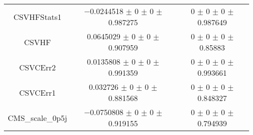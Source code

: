 \begin{table}
\begin{tabular}{ccc}
CSVHFStats1 & \num{-0.0244518} $\pm$ \num{0} $\pm$ \num{0} $\pm$ \num{0.987275} & \num{0} $\pm$ \num{0} $\pm$ \num{0} $\pm$ \num{0.987649}\\
CSVHF & \num{0.0645029} $\pm$ \num{0} $\pm$ \num{0} $\pm$ \num{0.907959} & \num{0} $\pm$ \num{0} $\pm$ \num{0} $\pm$ \num{0.85883}\\
CSVCErr2 & \num{0.0135808} $\pm$ \num{0} $\pm$ \num{0} $\pm$ \num{0.991359} & \num{0} $\pm$ \num{0} $\pm$ \num{0} $\pm$ \num{0.993661}\\
CSVCErr1 & \num{0.032726} $\pm$ \num{0} $\pm$ \num{0} $\pm$ \num{0.881568} & \num{0} $\pm$ \num{0} $\pm$ \num{0} $\pm$ \num{0.848327}\\
CMS\_scale\_0p5j & \num{-0.0750808} $\pm$ \num{0} $\pm$ \num{0} $\pm$ \num{0.919155} & \num{0} $\pm$ \num{0} $\pm$ \num{0} $\pm$ \num{0.794939}\\
\bottomrule
\end{tabular}
\end{table}